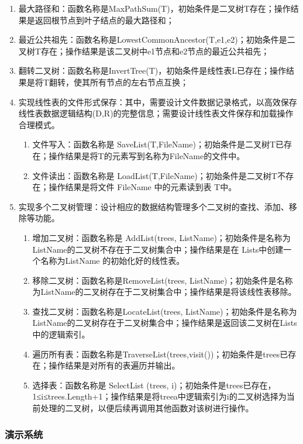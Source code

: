 \documentclass[supercite]{Experimental_Report}
\newcommand{\whiteding}[1]{\ding{\numexpr171+#1\relax}}
\theoremstyle{definition}
\begin{document}
\begin{enumerate}
    \item 最大路径和：函数名称是MaxPathSum(T)，初始条件是二叉树T存在；操作结果是返回根节点到叶子结点的最大路径和；
    \item 最近公共祖先：函数名称是LowestCommonAncestor(T,e1,e2)；初始条件是二叉树T存在；操作结果是该二叉树中e1节点和e2节点的最近公共祖先；
    \item 翻转二叉树：函数名称是InvertTree(T)，初始条件是线性表L已存在；操作结果是将T翻转，使其所有节点的左右节点互换；
    \item 实现线性表的文件形式保存：其中，\whiteding{1}需要设计文件数据记录格式，以高效保存线性表数据逻辑结构(D,{R})的完整信息；\whiteding{2}需要设计线性表文件保存和加载操作合理模式。
	\begin{enumerate}
	\item 文件写入：函数名称是 SaveList(T,FileName)；初始条件是二叉树T已存在；操作结果是将T的元素写到名称为FileName的文件中。
	\item 文件读出：函数名称是 LoadList(T,FileName)；初始条件是二叉树T不存在；操作结果是将文件 FileName 中的元素读到表 T中。
	\end{enumerate}
    \item 实现多个二叉树管理：设计相应的数据结构管理多个二叉树的查找、添加、移除等功能。
	\begin{enumerate}
	\item 增加二叉树：函数名称是 AddList(trees, ListName)；初始条件是名称为ListName的二叉树不存在于二叉树集合中；操作结果是在 Lists中创建一个名称为ListName 的初始化好的线性表。
	\item 移除二叉树：函数名称是RemoveList(trees, ListName)；初始条件是名称为ListName的二叉树存在于二叉树集合中；操作结果是将该线性表移除。
	\item 查找二叉树：函数名称是LocateList(trees, ListName)；初始条件是名称为ListName的二叉树存在于二叉树集合中；操作结果是返回该二叉树在Lists中的逻辑索引。
	\item 遍历所有表：函数名称是TraverseList(trees,visit())；初始条件是trees已存在；操作结果是对所有的表遍历并输出。
	\item 选择表：函数名称是 SelectList (trees, i)；初始条件是trees已存在，1≤i≤trees.Length+1；操作结果是将treea中逻辑索引为i的二叉树选择为当前处理的二叉树，以便后续再调用其他函数对该树进行操作。
	\end{enumerate}
\end{enumerate}

\subsubsection{演示系统}
\end{document}
